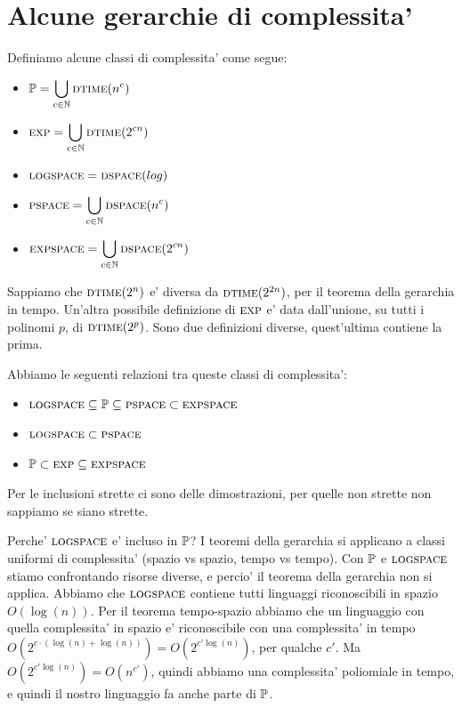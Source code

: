 \section{Alcune gerarchie di complessita'}

Definiamo alcune classi di complessita' come segue:
\begin{itemize}
    \item $\mathbb{P} = \displaystyle\bigcup_{c \in \mathbb{N}}\textsc{dtime}(n^{c})$
    \item $\textsc{exp} = \displaystyle\bigcup_{c \in \mathbb{N}}\textsc{dtime}(2^{cn})$
    \item $\textsc{logspace} = \textsc{dspace}(log)$
    \item $\textsc{pspace} = \displaystyle\bigcup_{c \in \mathbb{N}}\textsc{dspace}(n^{c})$
    \item $\textsc{expspace} = \displaystyle\bigcup_{c \in \mathbb{N}}\textsc{dspace}(2^{cn})$
\end{itemize}

Sappiamo che $\textsc{dtime}(2^{n})$ e' diversa da $\textsc{dtime}(2^{2n})$, per il teorema della gerarchia in
tempo.  Un'altra possibile definizione di $\textsc{exp}$ e' data dall'unione, su tutti i polinomi $p$, di
$\textsc{dtime}(2^{p})$. Sono due definizioni diverse, quest'ultima contiene la prima.

Abbiamo le seguenti relazioni tra queste classi di complessita':
\begin{itemize}
    \item $\textsc{logspace} \subseteq \mathbb{P} \subseteq \textsc{pspace} \subset \textsc{expspace}$
    \item $\textsc{logspace} \subset \textsc{pspace}$
    \item $\mathbb{P} \subset \textsc{exp} \subseteq \textsc{expspace}$
\end{itemize}

Per le inclusioni strette ci sono delle dimostrazioni, per quelle non strette non
sappiamo se siano strette.

Perche' $\textsc{logspace}$ e' incluso in $\mathbb{P}$? I teoremi della gerarchia si applicano a classi uniformi di
complessita' (spazio vs spazio, tempo vs tempo). Con $\mathbb{P}$ e $\textsc{logspace}$ stiamo confrontando risorse
diverse, e percio' il teorema della gerarchia non si applica. Abbiamo che $\textsc{logspace}$ contiene tutti
linguaggi riconoscibili in spazio $O(\log(n))$. Per il teorema tempo-spazio abbiamo che un
linguaggio con quella complessita' in spazio e' riconoscibile con una complessita' in tempo
$O(2^{c\cdot(\log(n) + \log(n))}) = O(2^{c'\log(n)})$, per qualche $c'$. Ma $O(2^{c'\log(n)}) =
O(n^{c'})$, quindi abbiamo una complessita' poliomiale in tempo, e quindi il nostro linguaggio fa
anche parte di $\mathbb{P}$.

